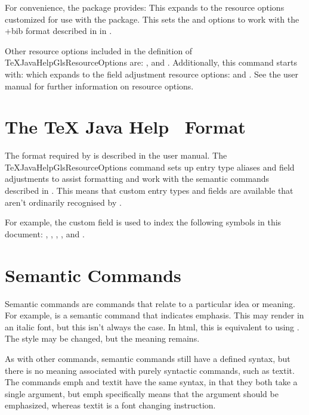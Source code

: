 \documentclass[toc=listof]{scrreport}
\newcommand{\TeXJavaHelp}{\texorpdfstring{\TeX}{TeX} Java Help}
\begin{document}
For convenience, the  package provides:
This expands to the resource options customized for use with the
 package. This sets the 
and  options to work with the \ext+{bib} format described in
in .

Other resource options included in the definition of
\gls{TeXJavaHelpGlsResourceOptions}
are: ,  and . Additionally, this command
starts with:
which expands to the field adjustment resource options: 
 and .
See the  user manual for further information on resource options.

\section{The \TeXJavaHelp\  Format}
\label{sec:bibformat}

The  format required by  is described in the
 user manual. The \gls{TeXJavaHelpGlsResourceOptions} command
sets up entry type aliases and field adjustments to assist formatting and work
with the semantic commands described in .
This means that custom entry types and fields are available that aren't
ordinarily recognised by .

For example, the custom  field is used to index
the following symbols in this document:
, , ,
, and .


\section{Semantic Commands}
\label{sec:semanticcmds}

Semantic commands are commands that relate to a particular idea or meaning.
For example,  is a semantic command that indicates
emphasis. This may render  in an italic font, but this isn't always the
case. In \gls{html}, this is equivalent to using
.
The style may be changed, but the meaning remains.

As with other commands, semantic commands still have a defined syntax, but
there is no meaning associated with purely syntactic commands, such as
\gls{textit}. The commands \gls{emph} and \gls{textit} have the same syntax, in that
they both take a single argument, but \gls{emph} specifically means that the
argument should be emphasized, whereas \gls{textit} is a font changing
instruction.
\end{document}
